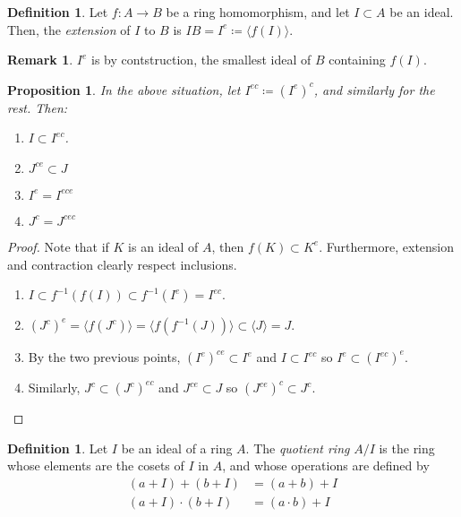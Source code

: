 \documentclass[11pt]{article}
\newtheorem{prop}[theorem]{Proposition}
\theoremstyle{definition}
\newtheorem{defn}[theorem]{Definition}
\newtheorem{rk}[theorem]{Remark}
\begin{document}
        \begin{defn}
            Let $f: A \rightarrow B$ be a ring homomorphism, and let $I \subset A$ be an ideal.
            Then, the \emph{extension} of $ I$ to $B$ is $IB = I^{e} \coloneqq \langle f(I) \rangle$.
        \end{defn}

        \begin{rk}
            $I^{e}$ is by contstruction, the smallest ideal of $B$ containing $f(I)$.
        \end{rk}

        \begin{prop} \label{prop:extension-and-contraction}
            In the above situation, let $I^{ec} \coloneqq (I^e)^c$, and similarly for the rest.
            Then:
            \begin{enumerate}
                \item $I \subset I^{ec}$.
                \item $J^{ce} \subset J$
                \item $I^e = I^{ece}$
                \item $J^c = J^{cec}$
            \end{enumerate}
        \end{prop}

        \begin{proof}
            Note that if $K$ is an ideal of $A$, then $f(K) \subset K^e$.
            Furthermore, extension and contraction clearly respect inclusions.
            \begin{enumerate}
                \item $I \subset f^{-1}(f(I)) \subset f^{-1}(I^e) = I^{ec}$.
                \item $(J^{c})^e = \langle f(J^c) \rangle = \langle f(f^{-1}(J))\rangle \subset \langle J  \rangle = J$.

                \item By the two previous points, $(I^e)^{ce} \subset I^e$ and $I\subset I^{ec}$ so
                $I^e \subset (I^{ec})^e$.

                \item Similarly, $J^c \subset (J^c)^{ec}$ and $J^{ce} \subset J$ so
                $(J^{ce})^c \subset J^c$.
            \end{enumerate}
        \end{proof}

        \begin{defn}
            Let $I$ be an ideal of a ring $A$.
            The \emph{quotient ring} $A/I$ is the ring whose elements are the cosets of $I$ in $A$, and whose operations are defined by
            \begin{align}
                (a + I) + (b + I) &= (a + b) + I \nonumber \\
                (a + I) \cdot (b + I) &= (a \cdot b) + I \nonumber
            \end{align}
        \end{defn}
\end{document}
